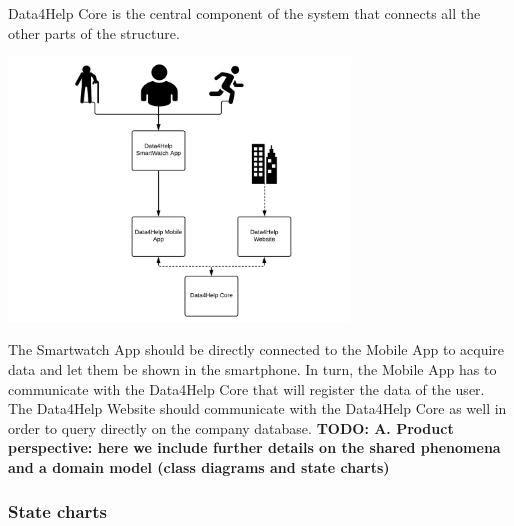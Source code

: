 Data4Help Core is the central component of the system that connects all the other parts of the structure.
\begin{center}
    \includegraphics[height=7cm]{assets/useflow.pdf}
\end{center}

The Smartwatch App should be directly connected to the Mobile App to acquire data and let them be shown in the smartphone. In turn, the Mobile App has to communicate with the Data4Help Core that will register the data of the user. The Data4Help Website should communicate with the Data4Help Core as well in order to query directly on the company database.
\newline
\textbf{
TODO: 
A. Product perspective: here we include further details on the shared phenomena and a
domain model (\textbf{class diagrams and state charts)}
}

\subsubsection{State charts}

